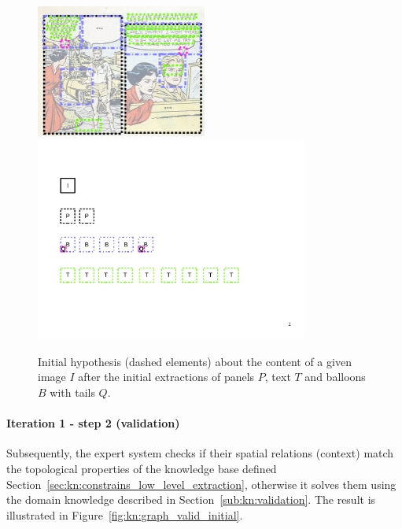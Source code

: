  \begin{figure}[!ht]  %
   \centering
   \includegraphics[trim= 0px 0px 0px 0px, clip, width=0.5\textwidth]{process_illustration_hypo_1.png}\\
  \includegraphics[trim= 30px 168px 100px 110px, clip, width=0.8\textwidth]{graph_init_1_non_orderred.pdf}
  \caption[Initial hypothesis about the content of a given image]{Initial hypothesis (dashed elements) about the content of a given image $I$ after the initial extractions of panels $P$, text $T$ and balloons $B$ with tails $Q$.
  }
  \label{fig:kn:graph0}
 \end{figure}

\paragraph{Iteration 1 - step 2 (validation)} %
\label{par:step_2}
Subsequently, the expert system checks if their spatial relations (context) match the topological properties of the knowledge base defined Section~\ref{sec:kn:constrains_low_level_extraction}, otherwise it solves them using the domain knowledge described in Section~\ref{sub:kn:validation}.
The result is illustrated in Figure~\ref{fig:kn:graph_valid_initial}.


